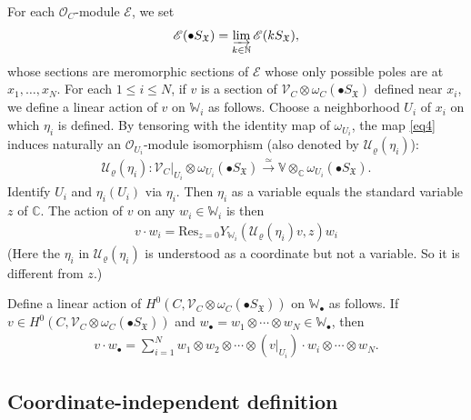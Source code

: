 \documentclass[11pt,b5paper,notitlepage]{article}
\theoremstyle{definition}
\theoremstyle{plain}
\newcommand{\fk}{\mathfrak}
\newcommand{\mc}{\mathcal}
\newcommand{\Res}{\mathrm{Res}}
\newcommand{\scr}{\mathscr}
\newcommand{\SX}{S_{\fk X}}
\newcommand{\blt}{\bullet}
\newcommand{\Vbb}{\mathbb V}
\newcommand{\Wbb}{\mathbb W}
\newcommand{\Cbb}{\mathbb C}
\newcommand{\Nbb}{\mathbb N}
\numberwithin{equation}{section}
\begin{document}
For each $\scr O_C$-module $\scr E$,  we \index{SX@$k\SX,\blt\SX$} set
\begin{align*}
\scr E(\blt\SX)=\varinjlim_{k\in\Nbb}\scr E(k\SX),
\end{align*}
whose sections are meromorphic sections of $\scr E$ whose only possible poles are at $x_1,\dots,x_N$. For each $1\leq i\leq N$, if $v$ is a section of $\scr V_C\otimes\omega_C(\blt S_{\fk X})$ defined near $x_i$, we define a linear action of $v$ on $\Wbb_i$ as follows. Choose a neighborhood $U_i$ of $x_i$ on which $\eta_i$ is defined. By tensoring with the identity map of $\omega_{U_i}$,  the map \eqref{eq4} induces naturally an $\scr O_{U_i}$-module isomorphism (also denoted by $\mc U_\varrho(\eta_i)$):
\begin{align*}
\mc U_\varrho(\eta_i):\scr V_C|_{U_i}\otimes\omega_{U_i}(\blt S_{\fk X})\xrightarrow{\simeq}\Vbb\otimes_{\Cbb}\omega_{U_i}(\blt S_{\fk X}).
\end{align*}
Identify $U_i$ and $\eta_i(U_i)$ via $\eta_i$. Then $\eta_i$ as a variable equals the standard variable $z$ of $\Cbb$. The action of $v$ on any $w_i\in\Wbb_i$ \index{vw@$v\cdot w_i,v\cdot w_\blt$} is  then
\begin{align}
\boxed{~~v\cdot w_i=\Res_{z=0}Y_{\Wbb_i}(\mc U_\varrho(\eta_i)v,z)w_i~~}\label{eq26}
\end{align}
(Here the $\eta_i$ in $\mc U_\varrho(\eta_i)$ is understood as a coordinate but not a variable. So it is different from $z$.)

Define a linear action of $H^0(C,\scr V_C\otimes\omega_C(\blt S_{\fk X}))$ on $\Wbb_\blt$ as follows.  
If $v\in H^0(C,\scr V_C\otimes\omega_C(\blt S_{\fk X}))$ and $w_\blt=w_1\otimes\cdots\otimes w_N\in\Wbb_\blt$, then
\begin{align}
v\cdot w_\blt=\sum_{i=1}^N w_1\otimes w_2\otimes\cdots \otimes (v|_{U_i})\cdot w_i \otimes\cdots\otimes w_N.\label{eq27}
\end{align}




\subsection*{Coordinate-independent definition}
\end{document}
